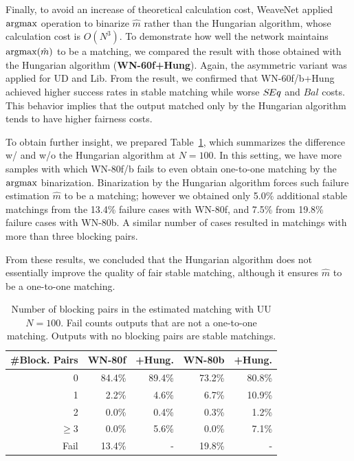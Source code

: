 Finally, to avoid an increase of theoretical calculation cost, WeaveNet applied ${\rm argmax}$ operation to binarize $\hat{m}$ rather than the Hungarian algorithm, whose calculation cost is $O(N^3)$. 
To demonstrate how well the network maintains ${\rm argmax}(\hat{m})$ to be a matching, we compared the result with those obtained with the Hungarian algorithm ({\bf WN-60f+Hung}). Again, the asymmetric variant was applied for UD and Lib.
From the result, we confirmed that WN-60f/b+Hung achieved higher success rates in stable matching while worse $S\hspace{-0.1em}Eq$ and $Bal$ costs. 
This behavior implies that the output matched only by the Hungarian algorithm tends to have higher fairness costs.

To obtain further insight, we prepared Table~\ref{tab:N100_bp}, which summarizes the difference w/ and w/o the Hungarian algorithm at $N=100$. In this setting, we have more samples with which WN-80f/b fails to even obtain one-to-one matching by the ${\rm argmax}$ binarization.
Binarization by the Hungarian algorithm forces such failure estimation $\hat{m}$ to be a matching; however we obtained only 5.0\% additional stable matchings from the 13.4\% failure cases with WN-80f, and 7.5\% from 19.8\% failure cases with WN-80b. A similar number of cases resulted in matchings with more than three blocking pairs. 

From these results, we concluded that the Hungarian algorithm does not essentially improve the quality of fair stable matching, although it ensures $\hat{m}$ to be a one-to-one matching.

\begin{table}
\centering
{    \small
     \setlength\tabcolsep{4pt} %
    \begin{tabular}{rrr|rr}
    \toprule
        \multicolumn{1}{c}{\#Block. Pairs} & \multicolumn{1}{c}{WN-80f} & \multicolumn{1}{c|}{+Hung.} & \multicolumn{1}{c}{WN-80b} & \multicolumn{1}{c}{+Hung.} \\
        \midrule
        0  & 84.4\% & 89.4\%     & 73.2\% & 80.8\% \\  %
        1 & 2.2\% & 4.6\%        & 6.7\% & 10.9\% \\ %
        2 & 0.0\% & 0.4\%        & 0.3\% & 1.2\% \\ %
        $\geq 3$ & 0.0\% & 5.6\% & 0.0\% & 7.1\% \\ %
        Fail & 13.4\% & -        & 19.8\% & - \\ %
        \bottomrule
    \end{tabular}
}
    \caption{Number of blocking pairs in the estimated matching with UU $N=100$. Fail counts outputs that are not a one-to-one matching. Outputs with no blocking pairs are stable matchings.}
    \label{tab:N100_bp}
\end{table}

